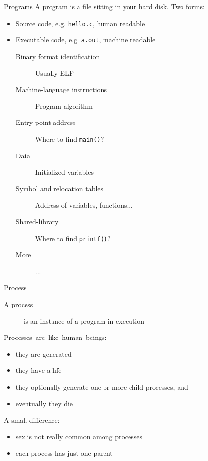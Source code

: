 \begin{frame}{Programs}
A program is a file sitting in your hard disk. Two forms:
\begin{itemize}
\item Source code, e.g. \texttt{hello.c}, human readable
\item Executable code, e.g. \texttt{a.out}, machine readable
  \begin{description}
  \item[Binary format identification] Usually ELF
  \item[Machine-language instructions] Program algorithm
  \item[Entry-point address] Where to find \texttt{main()}?
  \item[Data] Initialized variables
  \item[Symbol and relocation tables] Address of variables, functions...
  \item[Shared-library] Where to find \texttt{printf()}?
  \item[More] ...
  \end{description}
\end{itemize}
\end{frame}

\begin{frame}{Process}
  \begin{description}
  \item[A process] is an instance of a program in execution
  \end{description}
  \begin{minipage}{.65\linewidth}
    \begin{block}{\mbox{Processes are like human beings:}}
        \begin{itemize}
        \item[\Symbol{➠}] they are generated
        \item[\Symbol{➠}] they have a life
        \item[\Symbol{➠}] they optionally generate one or more child processes, and
        \item[\Symbol{➠}] eventually they die
        \end{itemize}
        A small difference:
        \begin{itemize}
        \item sex is not really common among processes
        \item each process has just one parent
        \end{itemize}
      \end{block}
  \end{minipage}\quad
  \begin{minipage}{.3\linewidth}
    \begin{center}
    \end{center}
  \end{minipage}
\end{frame}

